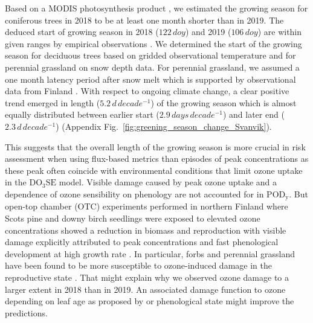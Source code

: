 \documentclass[bg, manuscript]{copernicus}
\begin{document}
Based on a MODIS photosynthesis product \citep{MODIS_PSN}, we estimated the growing season for coniferous trees in 2018 to be at least one month shorter than in 2019. The deduced start of growing season in 2018 ($122\,\unit{doy}$) and 2019 ($106\,\unit{doy}$) are within given ranges by empirical observations \citep{TB:Kolari2007,IVL:Karlsson2018}. We determined the start of the growing season for deciduous trees based on gridded observational temperature and for perennial grassland on snow depth data. For perennial grassland, we assumed a one month latency period after snow melt which is supported by observational data from Finland \citep{FCR:Korhonen2018}. With respect to ongoing climate change, a clear positive trend emerged in length ($5.2\,\unit{d\,decade^{-1}}$) of the growing season which is almost equally distributed between earlier start ($2.9\,\unit{days\,decade^{-1}}$) and later end ($2.3\,\unit{d\,decade^{-1}}$) (Appendix Fig.~\ref{fig:greening_season_change_Svanvik}).

This suggests that the overall length of the growing season is more crucial in risk assessment when using flux-based metrics than episodes of peak concentrations as these peak \chem{[O_3]} often coincide with environmental conditions that limit ozone uptake in the $\mathrm{DO_3SE}$ model. Visible damage caused by peak ozone uptake and a dependence of ozone sensibility on phenology are not accounted for in $\mathrm{POD_y}$. But open-top chamber (OTC) experiments performed in northern Finland where Scots pine and downy birch seedlings were exposed to elevated ozone concentrations showed a reduction in biomass and reproduction with visible damage explicitly attributed to peak  concentrations and fast phenological development at high growth rate \citep{Amb:Manninen2009}. In particular, forbs and perennial grassland have been found to be more susceptible to ozone-induced damage in the reproductive state \citep{EP:Bassin2004}. That might explain why we observed ozone damage to a larger extent in 2018 than in 2019. An associated damage function to ozone depending on leaf age as proposed by \citet{AE:Musselman2006} or phenological state might improve the predictions.
\end{document}
